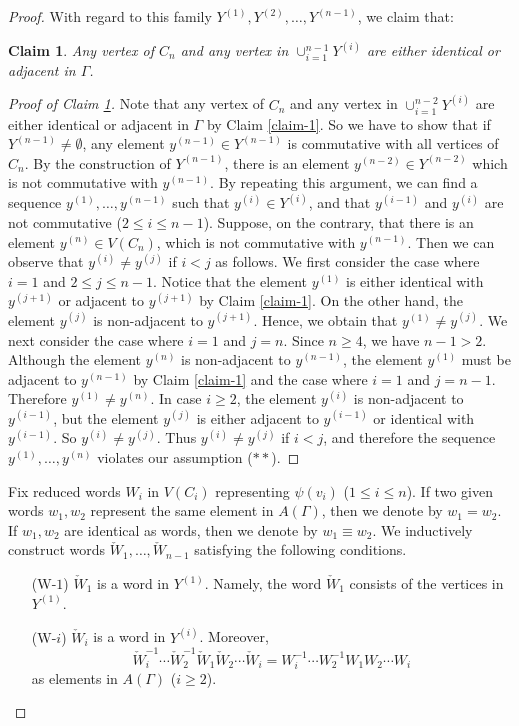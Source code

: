 \documentclass{amsart}
\theoremstyle{definition}
\theoremstyle{plain}
\newtheorem{claim}[definition]{Claim}
\numberwithin{equation}{section}
\begin{document}
\begin{proof}
With regard to this family $Y^{(1)}, Y^{(2)}, \ldots, Y^{(n-1)}$, we claim that: 

\begin{claim}
Any vertex of $C_n$ and any vertex in $\cup_{i=1}^{n-1} Y^{(i)}$ are either identical or adjacent in $\Gamma$. 
\label{claim-2}
\end{claim}
\begin{proof}[Proof of Claim \ref{claim-2}]
Note that any vertex of $C_n$ and any vertex in $\cup_{i=1}^{n-2} Y^{(i)}$ are either identical or  adjacent in $\Gamma$ by Claim \ref{claim-1}. 
So we have to show that if $Y^{(n-1)} \neq \emptyset$, any element $y^{(n-1)} \in Y^{(n-1)}$ is commutative with all vertices of $C_n$. 
By the construction of $Y^{(n-1)}$, there is an element $y^{(n-2)} \in Y^{(n-2)}$ which is not commutative with $y^{(n-1)}$. 
By repeating this argument, we can find a sequence $y^{(1)}, \ldots, y^{(n-1)}$ such that $y^{(i)} \in Y^{(i)}$, and that $y^{(i-1)}$ and $y^{(i)}$ are not commutative ($2 \leq i \leq n-1$). 
Suppose, on the contrary, that there is an element $y^{(n)} \in V(C_n)$, which is not commutative with $y^{(n-1)}$. 
Then we can observe that $y^{(i)} \neq y^{(j)}$ if $i < j$ as follows. 
We first consider the case where $i=1$ and $2 \leq j \leq n-1$. 
Notice that the element $y^{(1)}$ is either identical with $y^{(j+1)}$ or adjacent to $y^{(j+1)}$ by Claim \ref{claim-1}. 
On the other hand, the element $y^{(j)}$ is non-adjacent to $y^{(j+1)}$. 
Hence, we obtain that $y^{(1)} \neq y^{(j)}$. 
We next consider the case where $i=1$ and $j=n$. 
Since $n\geq 4$, we have $n-1 > 2$. 
Although the element $y^{(n)}$ is non-adjacent to $y^{(n-1)}$, the element $y^{(1)}$ must be adjacent to $y^{(n-1)}$ by Claim \ref{claim-1} and the case where $i=1$ and $j=n-1$. 
Therefore $y^{(1)} \neq y^{(n)}$. 
In case $i \geq 2$, the element $y^{(i)}$ is non-adjacent to $y^{(i-1)}$, but the element $y^{(j)}$ is either adjacent to $y^{(i-1)}$ or identical with $y^{(i-1)}$. 
So $y^{(i)} \neq y^{(j)}$. 
Thus $y^{(i)} \neq y^{(j)}$ if $i < j$, and therefore the sequence $y^{(1)}, \dots, y^{(n)}$ violates our assumption ($**$). 
\end{proof}

Fix reduced words $W_i$ in $V(C_i)$ representing $\psi(v_i)$ ($1 \leq i \leq n$). 
If two given words $w_1, w_2$ represent the same element in $A(\Gamma)$, then we denote by $w_1 = w_2$. 
If $w_1, w_2$ are identical as words, then we denote by $w_1 \equiv w_2$. 
We inductively construct words $\check{W}_1, \ldots, \check{W}_{n-1}$ satisfying the following conditions. 
\begin{enumerate}
 \item[(W-$1$)] $\check{W}_1$ is a word in $Y^{(1)}$. Namely, the word $\check{W}_1$ consists of the vertices in $Y^{(1)}$. 
 \item[(W-$i$)] $\check{W}_i$ is a word in $Y^{(i)}$. Moreover, 
 $$\check{W}_{i}^{-1} \cdots \check{W}_{2}^{-1} \check{W}_1 \check{W}_2 \cdots \check{W}_{i} = W_{i}^{-1} \cdots W_{2}^{-1} W_1 W_2 \cdots W_{i}$$ 
 as elements in $A(\Gamma)$ ($i \geq 2$). 
\end{enumerate}


\end{proof}
\end{document}
